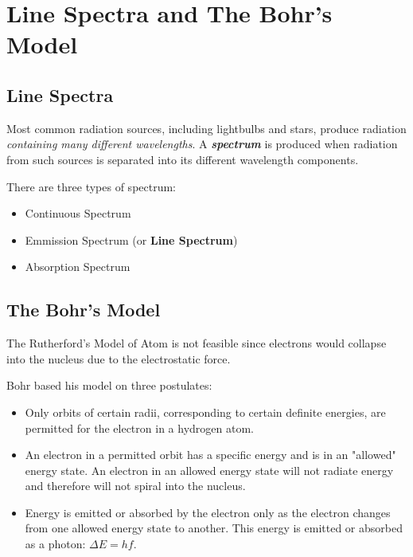 \documentclass[12pt, a4paper]{report}
\newcommand{\impt}[1]{\textbf{\textit{#1}}}
\newcommand{\hi}{\section}
\newcommand{\hii}{\subsection}
\begin{document}
\hi{Line Spectra and The Bohr's Model}
    \hii{Line Spectra}
        \par Most common radiation sources, including lightbulbs and stars, produce radiation
        \textit{containing many different wavelengths}. A \impt{spectrum} is produced when
        radiation from such sources is separated into its different wavelength components.
        \par There are three types of spectrum:
        \begin{itemize}
            \item Continuous Spectrum
            \item Emmission Spectrum (or \textbf{Line Spectrum})
            \item Absorption Spectrum
        \end{itemize}
    \hii{The Bohr's Model}
        \par The Rutherford's Model of Atom is not feasible since electrons would collapse into the
        nucleus due to the electrostatic force.
        \par Bohr based his model on three postulates:
        \begin{itemize}
            \item Only orbits of certain radii, corresponding to certain definite energies, are
                permitted for the electron in a hydrogen atom.
            \item An electron in a permitted orbit has a specific energy and is in an "allowed"
                energy state. An electron in an allowed energy state will not radiate energy
                and therefore will not spiral into the nucleus.
            \item Energy is emitted or absorbed by the electron only as the electron changes from
                one allowed energy state to another. This energy is emitted or absorbed as a
                photon: $\Delta E = hf$.
        \end{itemize}
\end{document}
